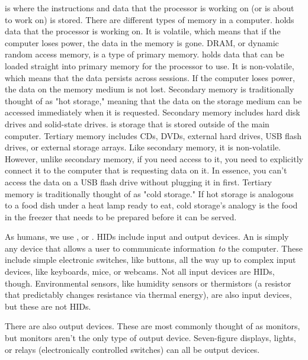  is where the instructions and data that the processor is working on (or is about to work on) is stored. There are different types of memory in a computer.  holds data that the processor is working on. It is volatile, which means that if the computer loses power, the data in the memory is gone. DRAM, or dynamic random access memory, is a type of primary memory.  holds data that can be loaded straight into primary memory for the processor to use. It is non-volatile, which means that the data persists across sessions. If the computer loses power, the data on the memory medium is not lost. Secondary memory is traditionally thought of as "hot storage," meaning that the data on the storage medium can be accessed immediately when it is requested. Secondary memory includes hard disk drives and solid-state drives.  is storage that is stored outside of the main computer. Tertiary memory includes CDs, DVDs, external hard drives, USB flash drives, or external storage arrays. Like secondary memory, it is non-volatile. However, unlike secondary memory, if you need access to it, you need to explicitly connect it to the computer that is requesting data on it. In essence, you can't access the data on a USB flash drive without plugging it in first. Tertiary memory is traditionally thought of as "cold storage." If hot storage is analogous to a food dish under a heat lamp ready to eat, cold storage's analogy is the food in the freezer that needs to be prepared before it can be served.\par
As humans, we use , or . HIDs include input and output devices. An  is simply any device that allows a user to communicate information \textit{to} the computer. These include simple electronic switches, like buttons, all the way up to complex input devices, like keyboards, mice, or webcams. Not all input devices are HIDs, though. Environmental sensors, like humidity sensors or thermistors (a resistor that predictably changes resistance via thermal energy), are also input devices, but these are not HIDs.\par
There are also output devices. These are most commonly thought of as monitors, but monitors aren't the only type of output device. Seven-figure displays, lights, or relays (electronically controlled switches) can all be output devices.\par
